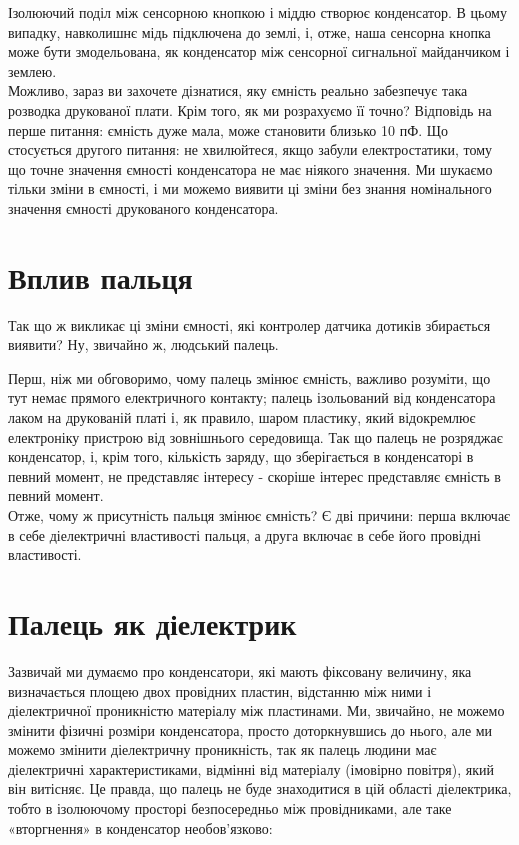\documentclass[a4paper,fontsize=12]{report}
\begin{document}
  \begin{figure}[h]
  \end{figure}


  Ізолюючий поділ між сенсорною кнопкою і міддю створює конденсатор. В цьому випадку, навколишнє мідь підключена до землі, і, отже, наша сенсорна кнопка може бути змодельована, як конденсатор між сенсорної сигнальної майданчиком і землею.\\

  Можливо, зараз ви захочете дізнатися, яку ємність реально забезпечує така розводка друкованої плати. Крім того, як ми розрахуємо її точно? Відповідь на перше питання: ємність дуже мала, може становити близько 10 пФ. Що стосується другого питання: не хвилюйтеся, якщо забули електростатики, тому що точне значення ємності конденсатора не має ніякого значення. Ми шукаємо тільки зміни в ємності, і ми можемо виявити ці зміни без знання номінального значення ємності друкованого конденсатора.\\
\section{Вплив пальця}

  Так що ж викликає ці зміни ємності, які контролер датчика дотиків збирається виявити? Ну, звичайно ж, людський палець.

  \begin{figure}[h]
  \end{figure}
  Перш, ніж ми обговоримо, чому палець змінює ємність, важливо розуміти, що тут немає прямого електричного контакту; палець ізольований від конденсатора лаком на друкованій платі і, як правило, шаром пластику, який відокремлює електроніку пристрою від зовнішнього середовища. Так що палець не розряджає конденсатор, і, крім того, кількість заряду, що зберігається в конденсаторі в певний момент, не представляє інтересу - скоріше інтерес представляє ємність в певний момент.\\

  Отже, чому ж присутність пальця змінює ємність? Є дві причини: перша включає в себе діелектричні властивості пальця, а друга включає в себе його провідні властивості.
\section{Палець як діелектрик}

  Зазвичай ми думаємо про конденсатори, які мають фіксовану величину, яка визначається площею двох провідних пластин, відстанню між ними і діелектричної проникністю матеріалу між пластинами. Ми, звичайно, не можемо змінити фізичні розміри конденсатора, просто доторкнувшись до нього, але ми можемо змінити діелектричну проникність, так як палець людини має діелектричні характеристиками, відмінні від матеріалу (імовірно повітря), який він витісняє. Це правда, що палець не буде знаходитися в цій області діелектрика, тобто в ізолюючому просторі безпосередньо між провідниками, але таке «вторгнення» в конденсатор необов'язково:
\end{document}
